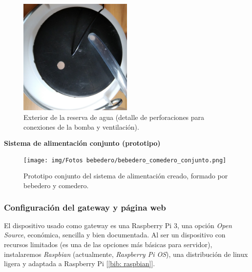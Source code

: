 \documentclass[12pt]{article}
\begin{document}
	\pagebreak
	
	\begin{figure}[h]
		\begin{center}
			\includegraphics[width=0.5\textwidth]{img/Fotos bebedero/agujeros_reserva_superior.png}
			\caption{Exterior de la reserva de agua (detalle de perforaciones para conexiones de la bomba y ventilación).}
			\label{Prototipo: reserva agua (detalle exterior superior)}
		\end{center}
	\end{figure}
	
	\pagebreak
	
	\noindent \textbf{Sistema de alimentación conjunto (prototipo)} \\

	\begin{figure}[h]
		\begin{center}
			\texttt{[image: img/Fotos bebedero/bebedero\_comedero\_conjunto.png]}
			\caption{Prototipo conjunto del sistema de alimentación creado, formado por bebedero y comedero.}
			\label{Prototipo: conjunto bebedero comedero}
		\end{center}
	\end{figure}

	\pagebreak	
	
	\subsubsection{Configuración del gateway y página web}
	\label{subsubsection: config GW y web}
	
	\noindent El dispositivo usado como gateway es una Raspberry Pi 3, una opción \textit{Open Source}, económica, sencilla y bien documentada. Al ser un dispositivo con recursos limitados (es una de las opciones más básicas para servidor), instalaremos \textit{Raspbian} (actualmente, \textit{Raspberry Pi OS}), una distribución de linux ligera y adaptada a Raspberry Pi [\ref{bib: raspbian}]. \\
	
\end{document}
